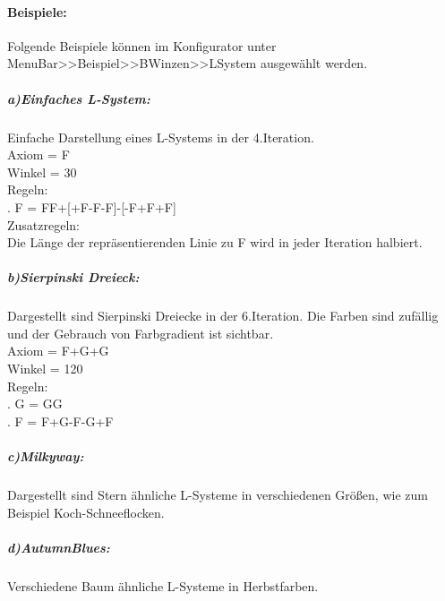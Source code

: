 \documentclass[../mciAusarbeitung.tex]{subfiles}
\begin{document}
\paragraph{Beispiele:}
	Folgende Beispiele können im Konfigurator unter MenuBar>>Beispiel>>BWinzen>>LSystem ausgewählt werden.
		\subparagraph{a)Einfaches L-System:} Einfache Darstellung eines L-Systems in der 4.Iteration.\\
	\indent\indent Axiom = F\\
	\indent\indent Winkel = 30 \\
	\indent\indent Regeln: \\
	\indent\indent{}. F = FF+[+F-F-F]-[-F+F+F] \\
	\indent\indent Zusatzregeln:\\
	\indent\indent\indent Die Länge der repräsentierenden Linie zu F wird in jeder Iteration halbiert.
	
	\subparagraph{b)Sierpinski Dreieck:} Dargestellt sind Sierpinski Dreiecke in der 6.Iteration. Die Farben sind zufällig und der Gebrauch von Farbgradient ist sichtbar.\\
	\indent\indent Axiom = F+G+G\\
	\indent\indent Winkel = 120 \\
	\indent\indent Regeln: \\
	\indent\indent{}. G = GG \\
	\indent\indent{}. F = F+G-F-G+F 
	\subparagraph{c)Milkyway:} Dargestellt sind Stern ähnliche L-Systeme in verschiedenen Größen, wie zum Beispiel Koch-Schneeflocken.
	\subparagraph{d)AutumnBlues:} Verschiedene Baum ähnliche L-Systeme in Herbstfarben.
	 
\end{document}
